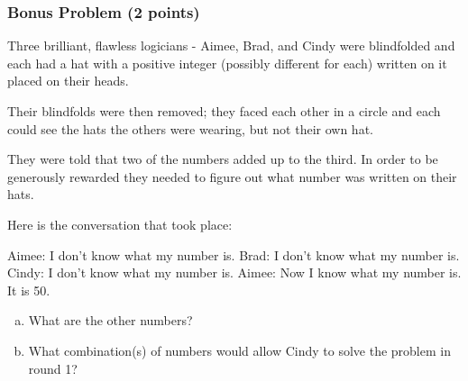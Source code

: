 \documentclass[11pt,onecolumn,fleqn]{article}
\theoremstyle{definition}
\begin{document}
\subsubsection*{Bonus Problem (2 points)}
Three brilliant, flawless logicians - Aimee, Brad, and Cindy were blindfolded and each had a hat with a 
positive integer (possibly different for each) written on it placed on their heads.

Their blindfolds were then removed; they faced each other in a circle and each could see the 
hats the others were wearing, but not their own hat.

They were told that two of the numbers added up to the third. In order to be generously rewarded 
they needed to figure out what number was written on their hats.

Here is the conversation that took place:

Aimee: I don't know what my number is.
\newline
Brad: I don't know what my number is.
\newline
Cindy: I don't know what my number is.
\newline
Aimee: Now I know what my number is. It is 50.

\begin{enumerate}[(a)]
	\item What are the other numbers?
	\item What combination(s) of numbers would allow Cindy to solve the problem in round 1?
\end{enumerate}
\end{document}
